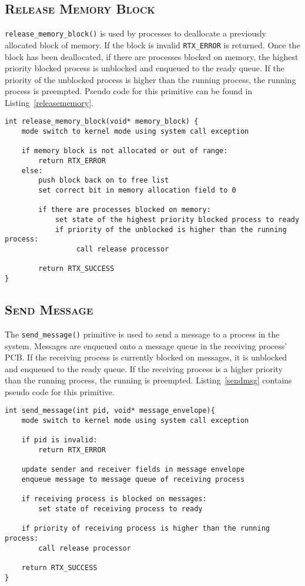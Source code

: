 \documentclass[oneside]{report}
\begin{document}
\subsection{\textsc{Release Memory Block}}

\texttt{release\_memory\_block()} is used by processes to deallocate a
previously allocated block of memory. If the block is invalid
\texttt{RTX\_ERROR} is returned. Once the block has been deallocated,
if there are processes blocked on memory, the highest priority blocked
process is unblocked and enqueued to the ready queue. If the priority
of the unblocked process is higher than the running process, the
running process is preempted. Pseudo code for this primitive can be
found in Listing~\ref{releasememory}.

\begin{lstlisting}
int release_memory_block(void* memory_block) {
    mode switch to kernel mode using system call exception

    if memory block is not allocated or out of range:
        return RTX_ERROR
    else:
        push block back on to free list
        set correct bit in memory allocation field to 0

        if there are processes blocked on memory:
            set state of the highest priority blocked process to ready
            if priority of the unblocked is higher than the running process:
                 call release processor

        return RTX_SUCCESS        
}
\end{lstlisting}

\subsection{\textsc{Send Message}}

The \texttt{send\_message()} primitive is used to send a message to a
process in the system. Messages are enqueued onto a message queue in
the receiving process' PCB. If the receiving process is currently
blocked on messages, it is unblocked and enqueued to the ready
queue. If the receiving process is a higher priority than the running
process, the running is preempted. Listing~\ref{sendmsg} contains
pseudo code for this primitive.

\begin{lstlisting}
int send_message(int pid, void* message_envelope){
    mode switch to kernel mode using system call exception

    if pid is invalid:
        return RTX_ERROR

    update sender and receiver fields in message envelope
    enqueue message to message queue of receiving process

    if receiving process is blocked on messages:
        set state of receiving process to ready

    if priority of receiving process is higher than the running process:
        call release processor

    return RTX_SUCCESS
}
\end{lstlisting}
\end{document}
